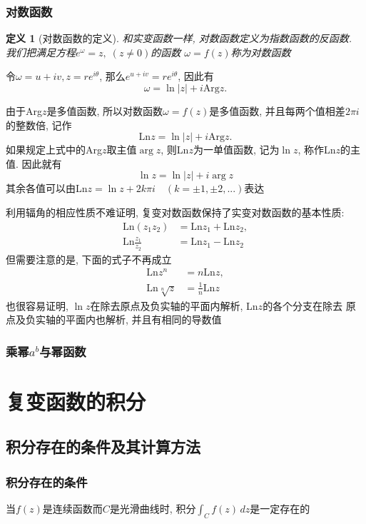 \documentclass[12pt, a4paper, oneside]{ctexart}
\theoremstyle{plain}
\newtheorem{definition}{定义}[section]
\theoremstyle{definition}
\theoremstyle{definition}
\begin{document}
\subsubsection{对数函数}
\begin{definition}[对数函数的定义]
和实变函数一样, 对数函数定义为指数函数的反函数. 我们把满足方程$e^\omega = z,\;(z\neq0)$的函数
$\omega=f(z)$称为对数函数
\end{definition}
令$\omega=u+iv,z=re^{i\theta}$, 那么$e^{u+iv}=re^{i\theta}$, 因此有
\[
\omega=\ln \left\lvert z\right\rvert +i\text{Arg}z.
\]

由于Arg$z$是多值函数, 所以对数函数$\omega=f(z)$是多值函数, 并且每两个值相差$2\pi i$的整数倍, 记作
\[
\text{Ln}z=\ln\left\lvert z\right\rvert +i\text{Arg}z.
\]
如果规定上式中的Arg$z$取主值$\arg z$, 则Ln$z$为一单值函数, 记为$\ln z$, 称作Ln$z$的主值. 因此就有
\[
\ln z= \ln \left\lvert z\right\rvert + i\arg z
\]
其余各值可以由Ln$z=\ln z+2k\pi i \quad(k=\pm1,\pm2,...)$表达

利用辐角的相应性质不难证明, 复变对数函数保持了实变对数函数的基本性质:
\begin{align*}
    \text{Ln}(z_1z_2) &= \text{Ln}z_1+\text{Ln}z_2,\\
    \text{Ln}\frac{z_1}{z_2} &= \text{Ln}z_1-\text{Ln}z_2
\end{align*}
   但需要注意的是, 下面的式子不再成立
\begin{align*}
    \text{Ln}z^n &= n\text{Ln}z,\\
    \text{Ln}\sqrt[n]{z} &= \frac{1}{n}\text{Ln}z
\end{align*}
也很容易证明, $\ln z$在除去原点及负实轴的平面内解析, Ln$z$的各个分支在除去
原点及负实轴的平面内也解析, 并且有相同的导数值

\subsubsection{乘幂$a^b$与幂函数}

\section{复变函数的积分}
\subsection{积分存在的条件及其计算方法}
\subsubsection{积分存在的条件}
当$f(z)$是连续函数而$C$是光滑曲线时, 积分$\int_{C}f(z)  \,dz $是一定存在的
\end{document}
